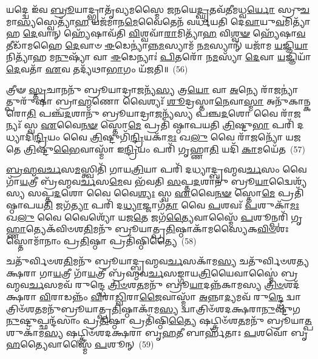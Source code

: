 𑌯𑌦𑍍𑌦𑍍𑌵𑍇 𑌇᳴𑌵 \ul{𑌬𑍍𑌰𑍂}\-𑌯𑌾𑌦𑍍𑌭𑍍𑌰𑌾𑌤𑍃᳴𑌵𑍍𑌯𑌮𑌸𑍍𑌮𑍈 𑌜𑌨𑌯𑍇\-\ul{𑌦𑍍𑌘𑍃}\-𑌤𑌵᳴𑌤𑍀𑌮𑌧𑍍𑌵\-\ul{𑌰𑍍𑌯𑍋} 𑌸𑍍𑌰𑍁\-\ul{𑌚}\-𑌮𑌾\-\ul{𑌸𑍍𑌯}\-𑌸𑍍𑌵𑍇𑌤𑍍𑌯𑌾᳴\-\ul{𑌹} 𑌯𑌜᳴𑌮𑌾𑌨\-\ul{𑌮𑍇}\-𑌵𑍈𑌤𑍇𑌨᳴ 𑌵𑌰𑍍𑌧𑌯𑌤𑌿 𑌦𑍇\-\ul{𑌵𑌾}\-𑌯𑍁\-\ul{𑌵}\-𑌮𑌿𑌤𑍍𑌯𑌾᳴𑌹 \ul{𑌦𑍇}\-𑌵𑌾𑌨𑍍 𑌹𑍍𑌯𑍇᳴𑌷𑌾𑌵᳴𑌤𑌿 \ul{𑌵𑌿}\-𑌶𑍍𑌵𑌵𑌾᳴\-\ul{𑌰𑌾}\-𑌮𑌿𑌤𑍍𑌯𑌾᳴\-\ul{𑌹} 𑌵𑌿\-\ul{𑌶𑍍𑌵}\-\-\ul{𑍟} 𑌹𑍍𑌯𑍇᳴𑌷𑌾\-\ul{𑌵}\-𑌤𑍀𑌡𑌾᳴𑌮𑌹𑍈 \ul{𑌦𑍇}\-𑌵𑌾𑍞 \ul{𑌈}\-𑌡𑍇𑌨𑍍𑌯𑌾॑𑌨𑍍𑌨\-\ul{𑌮}\-𑌸𑍍𑌯𑌾𑌮᳴ 𑌨\-\ul{𑌮}\-𑌸𑍍𑌯𑌾𑌨𑍍᳴ 𑌯𑌜𑌾᳴𑌮 \ul{𑌯}\-𑌜𑍍𑌞𑌿\-\ul{𑌯𑌾}\-𑌨𑌿𑌤𑍍𑌯𑌾᳴𑌹 𑌮\-\ul{𑌨𑍁}\-𑌷𑍍𑌯𑌾᳴ 𑌵𑌾 \ul{𑌈}\-𑌡𑍇𑌨𑍍𑌯𑌾𑌃॑ \ul{𑌪𑌿}\-𑌤𑌰𑍋᳴ 𑌨\-\ul{𑌮}\-𑌸𑍍𑌯𑌾᳴ \ul{𑌦𑍇}\-𑌵𑌾 \ul{𑌯}\-𑌜𑍍𑌞𑌿𑌯𑌾᳴ \ul{𑌦𑍇}\-𑌵𑌤𑌾᳴ \ul{𑌏}\-𑌵 𑌤𑌦𑍍𑌯᳴𑌥𑌾\-\ul{𑌭𑌾}\-𑌗𑌂 𑌯᳴𑌜𑌤𑌿॥~(56)

{\anuvakamend[{𑌵𑌿𑌪𑍍𑌰𑌾᳴𑌨𑍁𑌮𑌦𑌿\-\ul{𑌤} 𑌇𑌤𑍍𑌯𑌾᳴𑌹 \ul{𑌚}\-𑌨𑌾\-\ul{𑌸𑍍𑌮𑍈} 𑌹𑍋𑌤𑍋᳴\-\ul{𑌪}\-𑌭𑍃\-\ul{𑌦𑍍𑌦𑍇}\-𑌵𑌤𑌾᳴ \ul{𑌏}\-𑌵 𑌤𑍍𑌰𑍀𑌣𑌿᳴ 𑌚}]}%

𑌤𑍍𑌰𑍀𑍟 \ul{𑌸𑍍𑌤𑍃}\-𑌚𑌾𑌨𑌨𑍁᳴ 𑌬𑍍𑌰𑍂𑌯𑌾𑌦𑍍𑌰𑌾\-\ul{𑌜}\-𑌨𑍍𑌯᳴\-\ul{𑌸𑍍𑌯} 𑌤𑍍𑌰\-\ul{𑌯𑍋} 𑌵𑌾 \ul{𑌅}\-𑌨𑍍𑌯𑍇 𑌰𑌾᳴\-\ul{𑌜}\-𑌨𑍍𑌯𑌾॑𑌤𑍍𑌪𑍁𑌰𑍁᳴𑌷𑌾 𑌬𑍍𑌰𑌾\-\ul{𑌹𑍍𑌮}\-𑌣𑍋 𑌵𑍈𑌶𑍍𑌯𑌃᳴ \ul{𑌶𑍂}\-𑌦𑍍𑌰𑌸𑍍𑌤𑌾\-\ul{𑌨𑍇}\-𑌵𑌾\-\ul{𑌸𑍍𑌮𑌾} 𑌅𑌨𑍁᳴𑌕𑌾𑌨𑍍𑌕𑌰𑍋\-\ul{𑌤𑌿} 𑌪𑌞𑍍𑌚᳴\-\ul{𑌦}\-𑌶𑌾𑌨𑍁᳴ 𑌬𑍍𑌰𑍂𑌯𑌾𑌦𑍍𑌰𑌾\-\ul{𑌜}\-𑌨𑍍𑌯᳴𑌸𑍍𑌯 𑌪𑌞𑍍𑌚\-\ul{𑌦}\-𑌶𑍋 𑌵𑍈 𑌰𑌾᳴\-\ul{𑌜}\-𑌨𑍍𑌯𑌃᳴ 𑌸𑍍𑌵 \ul{𑌏}\-𑌵𑍈\-\ul{𑌨}\-\-\ul{𑍟} 𑌸𑍍𑌤𑍋\-\ul{𑌮𑍇} 𑌪𑍍𑌰𑌤𑌿᳴ 𑌷𑍍𑌠𑌾𑌪𑌯𑌤𑌿 \ul{𑌤𑍍𑌰𑌿}\-𑌷𑍍𑌟𑍁\-\ul{𑌭𑌾} 𑌪𑌰𑌿᳴ 𑌦𑌧𑍍𑌯𑌾𑌦𑌿\-\ul{𑌨𑍍𑌦𑍍𑌰𑌿}\-𑌯𑌂 𑌵𑍈 \ul{𑌤𑍍𑌰𑌿}\-𑌷𑍍𑌟𑍁𑌗𑌿᳴\-\ul{𑌨𑍍𑌦𑍍𑌰𑌿}\-𑌯𑌕𑌾᳴\-\ul{𑌮𑌃} 𑌖\-\ul{𑌲𑍁} 𑌵𑍈 𑌰𑌾᳴\-\ul{𑌜}\-𑌨𑍍𑌯𑍋᳴ 𑌯𑌜𑌤𑍇 \ul{𑌤𑍍𑌰𑌿}\-𑌷𑍍𑌟𑍁\-\ul{𑌭𑍈}\-𑌵𑌾𑌸𑍍𑌮𑌾᳴ 𑌇\-\ul{𑌨𑍍𑌦𑍍𑌰𑌿}\-𑌯𑌂 𑌪𑌰𑌿᳴ 𑌗𑍃𑌹𑍍𑌣𑌾\-\ul{𑌤𑌿} 𑌯𑌦𑌿᳴ \ul{𑌕𑌾}\-𑌮𑌯𑍇᳴𑌤~(57)

\-\ul{𑌬𑍍𑌰}\-\-\ul{𑌹𑍍𑌮}\-\-\ul{𑌵}\-\-\ul{𑌰𑍍𑌚}\-𑌸\-\ul{𑌮}\-𑌸𑍍𑌤𑍍𑌵𑌿𑌤𑌿᳴ 𑌗𑌾𑌯\-\ul{𑌤𑍍𑌰𑌿}\-𑌯𑌾 𑌪𑌰𑌿᳴ 𑌦𑌧𑍍𑌯𑌾𑌦𑍍𑌬𑍍𑌰𑌹𑍍𑌮𑌵\-\ul{𑌰𑍍𑌚}\-𑌸𑌂 𑌵𑍈 𑌗𑌾᳴\-\ul{𑌯}\-𑌤𑍍𑌰𑍀 𑌬𑍍𑌰᳴𑌹𑍍𑌮𑌵\-\ul{𑌰𑍍𑌚}\-𑌸\-\ul{𑌮𑍇}\-𑌵 𑌭᳴𑌵𑌤𑌿 \ul{𑌸}\-𑌪𑍍𑌤\-\ul{𑌦}\-𑌶𑌾𑌨𑍁᳴ 𑌬𑍍𑌰𑍂\-\ul{𑌯𑌾}\-𑌦𑍍𑌵𑍈𑌶𑍍𑌯᳴𑌸𑍍𑌯 𑌸𑌪𑍍𑌤\-\ul{𑌦}\-𑌶𑍋 𑌵𑍈 𑌵𑍈\-\ul{𑌶𑍍𑌯𑌃} 𑌸𑍍𑌵 \ul{𑌏}\-𑌵𑍈\-\ul{𑌨}\-\-\ul{𑍟} 𑌸𑍍𑌤𑍋\-\ul{𑌮𑍇} 𑌪𑍍𑌰𑌤𑌿᳴ 𑌷𑍍𑌠𑌾𑌪𑌯\-\ul{𑌤𑌿} 𑌜𑌗᳴\-\ul{𑌤𑍍𑌯𑌾} 𑌪𑌰𑌿᳴ 𑌦\-\ul{𑌧𑍍𑌯𑌾}\-𑌜𑍍𑌜𑌾𑌗᳴\-\ul{𑌤𑌾} 𑌵𑍈 \ul{𑌪}\-𑌶𑌵𑌃᳴ \ul{𑌪}\-𑌶𑍁𑌕𑌾᳴\-\ul{𑌮𑌃} 𑌖\-\ul{𑌲𑍁} 𑌵𑍈 𑌵𑍈𑌶𑍍𑌯𑍋᳴ 𑌯𑌜\-\ul{𑌤𑍇} 𑌜𑌗᳴\-\ul{𑌤𑍍𑌯𑍈}\-𑌵𑌾𑌸𑍍𑌮𑍈᳴ \ul{𑌪}\-𑌶𑍂𑌨𑍍𑌪𑌰𑌿᳴ 𑌗𑍃\-\ul{𑌹𑍍𑌣𑌾}\-𑌤𑍍𑌯𑍇𑌕᳴𑌵𑌿𑍞𑌶\-\ul{𑌤𑌿}\-𑌮𑌨𑍁᳴ 𑌬𑍍𑌰𑍂𑌯𑌾𑌤𑍍𑌪𑍍𑌰\-\ul{𑌤𑌿}\-𑌷𑍍𑌠𑌾𑌕𑌾᳴𑌮𑌸𑍍𑌯𑍈𑌕\-\ul{𑌵𑌿}\-\-\ul{𑍞}\-𑌶𑌃 𑌸𑍍𑌤𑍋𑌮𑌾᳴𑌨𑌾𑌂 𑌪𑍍𑌰\-\ul{𑌤𑌿}\-𑌷𑍍𑌠𑌾 𑌪𑍍𑌰𑌤𑌿᳴𑌷𑍍𑌠𑌿𑌤𑍍𑌯𑍈~(58)

𑌚𑌤𑍁᳴𑌰𑍍𑌵𑌿𑍞𑌶\-\ul{𑌤𑌿}\-𑌮𑌨𑍁᳴ 𑌬𑍍𑌰𑍂𑌯𑌾𑌦𑍍𑌬𑍍𑌰𑌹𑍍𑌮𑌵\-\ul{𑌰𑍍𑌚}\-𑌸𑌕𑌾᳴𑌮\-\ul{𑌸𑍍𑌯} 𑌚𑌤𑍁᳴𑌰𑍍𑌵𑌿𑍞𑌶𑌤𑍍𑌯𑌕𑍍𑌷𑌰𑌾 𑌗𑌾\-\ul{𑌯}\-𑌤𑍍𑌰𑍀 𑌗𑌾᳴\-\ul{𑌯}\-𑌤𑍍𑌰𑍀 𑌬𑍍𑌰᳴𑌹𑍍𑌮𑌵\-\ul{𑌰𑍍𑌚}\-𑌸𑌙𑍍𑌗𑌾𑌯\-\ul{𑌤𑍍𑌰𑌿}\-𑌯𑍈𑌵𑌾𑌸𑍍𑌮𑍈॑ 𑌬𑍍𑌰𑌹𑍍𑌮𑌵\-\ul{𑌰𑍍𑌚}\-𑌸𑌮𑌵᳴ 𑌰𑍁𑌨𑍍𑌦𑍍𑌧𑍇 \ul{𑌤𑍍𑌰𑌿}\-\-\ul{𑍞}\-𑌶\-\ul{𑌤}\-𑌮𑌨𑍁᳴ 𑌬𑍍𑌰𑍂\-\ul{𑌯𑌾}\-𑌦𑌨𑍍𑌨᳴𑌕𑌾𑌮𑌸𑍍𑌯 \ul{𑌤𑍍𑌰𑌿}\-\-\ul{𑍞}\-𑌶𑌦᳴𑌕𑍍𑌷𑌰𑌾 \ul{𑌵𑌿}\-𑌰𑌾𑌡𑌨𑍍𑌨𑌂᳴ \ul{𑌵𑌿}\-𑌰𑌾\-\ul{𑌡𑍍𑌵𑌿}\-𑌰𑌾\-\ul{𑌜𑍈}\-𑌵𑌾𑌸𑍍𑌮𑌾᳴ \ul{𑌅}\-𑌨𑍍𑌨𑌾\-\ul{𑌦𑍍𑌯}\-𑌮𑌵᳴ 𑌰𑍁\-\ul{𑌨𑍍𑌦𑍍𑌧𑍇} 𑌦𑍍𑌵𑌾𑌤𑍍𑌰𑌿𑍞᳴𑌶\-\ul{𑌤}\-𑌮𑌨𑍁᳴𑌬𑍍𑌰𑍂𑌯𑌾𑌤𑍍𑌪𑍍𑌰\-\ul{𑌤𑌿}\-𑌷𑍍𑌠𑌾𑌕𑌾᳴𑌮\-\ul{𑌸𑍍𑌯} 𑌦𑍍𑌵𑌾𑌤𑍍𑌰𑌿𑍞᳴𑌶𑌦𑌕𑍍𑌷𑌰𑌾\-\ul{𑌨𑍁}\-𑌷𑍍𑌟𑍁᳴𑌗\-\ul{𑌨𑍁}\-𑌷𑍍𑌟𑍁𑌪𑍍𑌛𑌨𑍍𑌦᳴𑌸𑌾𑌂 𑌪𑍍𑌰\-\ul{𑌤𑌿}\-𑌷𑍍𑌠𑌾 𑌪𑍍𑌰𑌤𑌿᳴𑌷𑍍𑌠𑌿\-\ul{𑌤𑍍𑌯𑍈} 𑌷𑌟𑍍𑌤𑍍𑌰𑌿𑍞᳴𑌶\-\ul{𑌤}\-𑌮𑌨𑍁᳴ 𑌬𑍍𑌰𑍂𑌯𑌾\-\ul{𑌤𑍍𑌪}\-𑌶𑍁𑌕𑌾᳴𑌮\-\ul{𑌸𑍍𑌯} 𑌷𑌟𑍍𑌤𑍍𑌰𑌿𑍞᳴𑌶𑌦𑌕𑍍𑌷𑌰𑌾 𑌬𑍃\-\ul{𑌹}\-𑌤𑍀 𑌬𑌾𑌰𑍍\mbox{}𑌹᳴𑌤𑌾𑌃 \ul{𑌪}\-𑌶𑌵𑍋᳴ 𑌬𑍃\-\ul{𑌹}\-𑌤𑍍𑌯𑍈𑌵𑌾𑌸𑍍𑌮𑍈᳴ \ul{𑌪}\-𑌶𑍂𑌨𑍍~(59)

